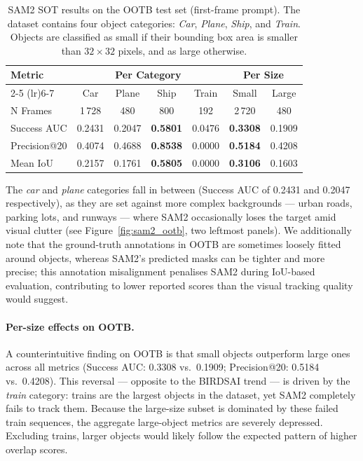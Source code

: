 \documentclass[11pt]{article}
\begin{document}
\begin{table}[htbp]
\centering
\begin{tabular}{l cccc cc}
\toprule
\textbf{Metric} & \multicolumn{4}{c}{\textbf{Per Category}} & \multicolumn{2}{c}{\textbf{Per Size}} \\
\cmidrule(lr){2-5} \cmidrule(lr){6-7}
 & Car & Plane & Ship & Train & Small & Large \\
\midrule
N Frames      & 1\,728 & 480    & 800    & 192   & 2\,720 & 480    \\
Success AUC   & 0.2431 & 0.2047 & \textbf{0.5801} & 0.0476 & \textbf{0.3308} & 0.1909 \\
Precision@20  & 0.4074 & 0.4688 & \textbf{0.8538} & 0.0000 & \textbf{0.5184} & 0.4208 \\
Mean IoU      & 0.2157 & 0.1761 & \textbf{0.5805} & 0.0000 & \textbf{0.3106} & 0.1603 \\
\bottomrule
\end{tabular}
\caption{SAM2 SOT results on the OOTB test set (first-frame prompt). The dataset contains four object categories: \textit{Car}, \textit{Plane}, \textit{Ship}, and \textit{Train}. Objects are classified as small if their bounding box area is smaller than $32\times32$ pixels, and as large otherwise.}
\label{tab:sot-ootb}
\end{table}

The \textit{car} and \textit{plane} categories fall in between (Success AUC of 0.2431 and 0.2047 respectively), 
as they are set against more complex backgrounds — urban roads, parking lots, and runways — where SAM2 occasionally loses the target 
amid visual clutter (see Figure~\ref{fig:sam2_ootb}, two leftmost panels). 
We additionally note that the ground-truth annotations in OOTB are sometimes loosely fitted around objects, 
whereas SAM2's predicted masks can be tighter and more precise; this annotation misalignment penalises SAM2 during IoU-based evaluation, 
contributing to lower reported scores than the visual tracking quality would suggest.

\paragraph{Per-size effects on OOTB.}
A counterintuitive finding on OOTB is that small objects outperform large ones across all metrics (Success AUC: 0.3308 vs.\ 0.1909; Precision@20: 0.5184 vs.\ 0.4208). This reversal — opposite to the BIRDSAI trend — is driven by the \textit{train} category: trains are the largest objects in the dataset, yet SAM2 completely fails to track them. Because the large-size subset is dominated by these failed train sequences, the aggregate large-object metrics are severely depressed. Excluding trains, larger objects would likely follow the expected pattern of higher overlap scores.
\end{document}
